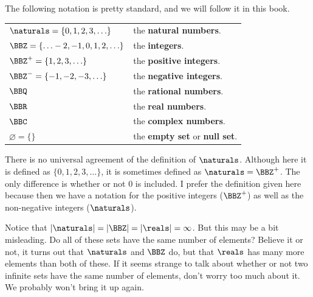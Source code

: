 \begin{df}
The following notation is pretty standard, and we will follow it in this book.

\noindent
\begin{center}
\begin{tabular}{ll}
$\naturals= \{0,1,2, 3, \ldots\}$ &  the {\bf natural numbers}.\index{natural numbers}
\index{a sets known Nat@$\naturals$ (natural numbers)}\\
$\BBZ = \{\ldots -2, -1, 0, 1,2, \ldots\}$& the {\bf integers}.\index{integers}
\index{a sets known Z@$\BBZ$ (integers)}\\
$\BBZ^+ = \{1,2,3, \ldots\}$& the {\bf positive  integers}.\index{positive integers}
\index{a sets known Z P@$\BBZ^+$ (positive integers)}\\
$\BBZ^- = \{-1,-2,-3, \ldots\}$& the {\bf negative integers}.\index{negative integers}
\index{a sets known Z Q@$\BBZ^-$ (negative integers)}\\
$\BBQ$& the {\bf rational numbers}.\index{rational numbers}
\index{a sets known Rational@$\BBQ$ (rational numbers)}\\
$\BBR$& the {\bf real numbers}.\index{real numbers}
\index{a sets known Real@$\BBR$ (real numbers)}\\
$\BBC$& the {\bf complex numbers}.\index{complex numbers}
\index{a sets known C@$\BBC$ (complex numbers)}\\
$\varnothing=\{\}$ &  the {\bf empty set} or {\bf null set}.
\index{empty set}\index{null set}\index{set!empty}
\index{a sets known ZZ@$\varnothing$ (empty set)}
\index{a sets known ZZ@$\{\}$ (empty set)}\\
\end{tabular}
\end{center}
\end{df}

\begin{rem}
There is no universal agreement of the definition of $\naturals$.  
Although here it is defined as
$\{0,1,2, 3, \ldots\}$, it is sometimes defined as $\naturals = \BBZ^+$.
The only difference is whether or not $0$ is included.
I prefer the definition given here because then we have a notation for the positive integers ($\BBZ^+$)
as well as the non-negative integers ($\naturals$).
\end{rem}


\begin{exa}
Notice that $|\naturals| = |\BBZ|= |\reals|=\infty$.  But this may be a bit misleading.  
Do all of these sets have the same number of elements?  Believe it or not, it turns out that 
$\naturals$ and $\BBZ$ do, but that $\reals$ has many more elements than both of these.
If it seems strange to talk about whether or not two infinite sets have the same number of elements, don't
worry too much about it.  We probably won't bring it up again.
\end{exa}


